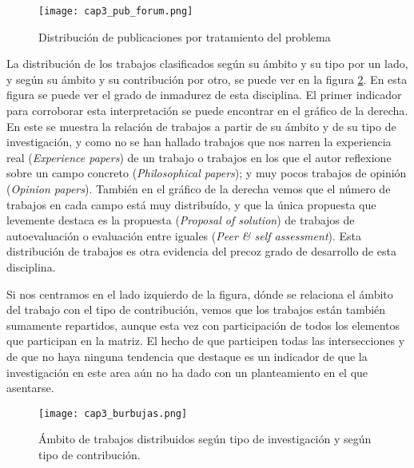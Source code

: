 \begin{figure}[H]
  \begin{center}
    \texttt{[image: cap3\_pub\_forum.png]}
  \end{center}
  \caption{Distribución de publicaciones por tratamiento del problema}
  \label{fig:PublicacionesForum}
\end{figure}


La distribución de los trabajos clasificados según su ámbito y su tipo por un lado, y según su ámbito y su contribución por otro, se puede ver en la figura \ref{fig:Burble}. En esta figura se puede ver el grado de inmadurez de esta disciplina. El primer indicador para corroborar esta interpretación se puede encontrar en el gráfico de la derecha. En este se muestra la relación de trabajos a partir de su ámbito y de su tipo de investigación, y como no se han hallado trabajos que nos narren la experiencia real (\emph{Experience papers}) de un trabajo o trabajos en los que el autor reflexione sobre un campo concreto (\emph{Philosophical papers}); y muy pocos trabajos de opinión (\emph{Opinion papers}). También en el gráfico de la derecha vemos que el número de trabajos en cada campo está muy distribuído, y que la única propuesta que levemente destaca es la propuesta (\emph{Proposal of solution}) de trabajos de autoevaluación o evaluación entre iguales (\emph{Peer \& self assessment}). Esta distribución de trabajos es otra evidencia del precoz grado de desarrollo de esta disciplina.

Si nos centramos en el lado izquierdo de la figura, dónde se relaciona el ámbito del trabajo con el tipo de contribución, vemos que los trabajos están también sumamente repartidos, aunque esta vez con participación de todos los elementos que participan en la matriz. El hecho de que participen todas las intersecciones y de que no haya ninguna tendencia que destaque es un indicador de que la investigación en este area aún no ha dado con un planteamiento en el que asentarse.


\begin{landscape}
\pagestyle{apaisado}
\begin{figure}[H]
  \begin{center}
    \texttt{[image: cap3\_burbujas.png]}
  \end{center}
  \caption{Ámbito de trabajos distribuidos según tipo de investigación y según tipo de contribución.}
  \label{fig:Burble}
\end{figure}
\end{landscape}
\pagestyle{normal}

